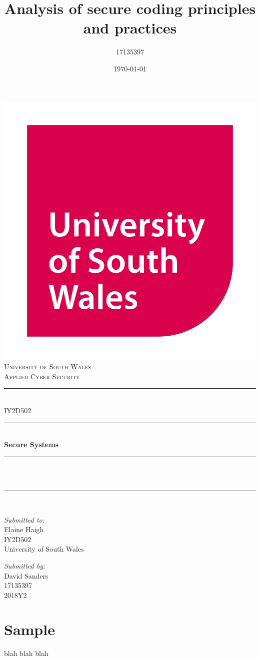 \documentclass[12pt]{article}
\title{Analysis of secure coding principles and practices}
\author{17135397}
\date{\today}
\makeatletter
\let\thetitle\@title
\makeatother
\begin{document}
\begin{titlepage}
  \centering
  \includegraphics[scale = 0.15]{usw_logo.jpg}\\[0.5cm]
  \textsc{\LARGE University of South Wales\\\Large Applied Cyber Security}\\[2cm]

  \rule{\linewidth}{0.2 mm} \\[0.5cm]
  { \huge IY2D502}\\
  \rule{\linewidth}{0.2 mm} \\[0.5cm]
  { \huge \bfseries Secure Systems}\\
  \rule{\linewidth}{0.2 mm} \\[0.5cm]
  \textsc{\Large \thetitle}\\
  \rule{\linewidth}{0.2 mm} \\[2cm]

  \begin{minipage}[t]{0.4\textwidth}
    \begin{flushleft} \large
      \textit{Submitted to:}\\
      Elaine Haigh\\IY2D502\\University of South Wales
    \end{flushleft}
  \end{minipage}
  \begin{minipage}[t]{0.4\textwidth}
    \begin{flushright} \large
      \textit{Submitted by:}\\
      David Sanders\\17135397\\2018Y2
    \end{flushright}
  \end{minipage}
\end{titlepage}



\tableofcontents
\pagebreak



\section{Sample}
blah blah blah
\end{document}
